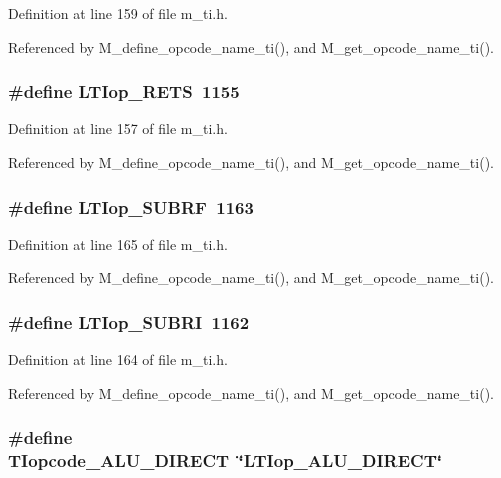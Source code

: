 Definition at line 159 of file m\_\-ti.h.

Referenced by M\_\-define\_\-opcode\_\-name\_\-ti(), and M\_\-get\_\-opcode\_\-name\_\-ti().
\subsubsection{\setlength{\rightskip}{0pt plus 5cm}\#define LTIop\_\-RETS~1155}\label{m__ti_8h_f8a9f15ff72e8279072cb0dc42952f5f}




Definition at line 157 of file m\_\-ti.h.

Referenced by M\_\-define\_\-opcode\_\-name\_\-ti(), and M\_\-get\_\-opcode\_\-name\_\-ti().
\subsubsection{\setlength{\rightskip}{0pt plus 5cm}\#define LTIop\_\-SUBRF~1163}\label{m__ti_8h_b117237bacf29b359e235af5a79e7fac}




Definition at line 165 of file m\_\-ti.h.

Referenced by M\_\-define\_\-opcode\_\-name\_\-ti(), and M\_\-get\_\-opcode\_\-name\_\-ti().
\subsubsection{\setlength{\rightskip}{0pt plus 5cm}\#define LTIop\_\-SUBRI~1162}\label{m__ti_8h_9eae13402e544a47b9955940342280a2}




Definition at line 164 of file m\_\-ti.h.

Referenced by M\_\-define\_\-opcode\_\-name\_\-ti(), and M\_\-get\_\-opcode\_\-name\_\-ti().
\subsubsection{\setlength{\rightskip}{0pt plus 5cm}\#define TIopcode\_\-ALU\_\-DIRECT~\char`\"{}LTIop\_\-ALU\_\-DIRECT\char`\"{}}\label{m__ti_8h_2ff3781ac0e5363b04311fc0bf41b691}




